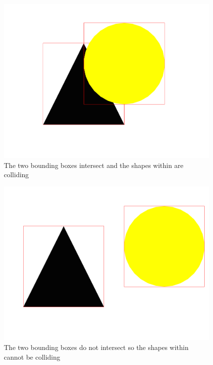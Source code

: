 \documentclass[]{report}
\begin{document}
			\begin{figure}[H]
				\centering
				\includegraphics[scale=0.25]{bbcollision}
				\caption{The two bounding boxes intersect and the shapes within are colliding}
				\label{bbcollision}
			\end{figure}
			\begin{figure}[H]
				\centering
				\includegraphics[scale=0.25]{bbnooverlap}
				\caption{The two bounding boxes do not intersect so the shapes within cannot be colliding}
				\label{bbnooverlap}
			\end{figure}
\end{document}
